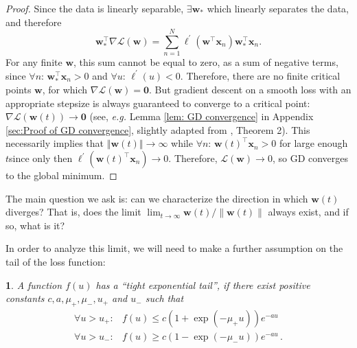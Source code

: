 \documentclass[twoside,11pt,english]{article}
\newtheorem{defn}[thm]{\protect\definitionname}
\providecommand{\definitionname}{Definition}
\providecommand{\definitionname}{Definition}
\begin{document}
\begin{proof}
Since the data is linearly separable, $\exists\mathbf{w}_{*}$
which linearly separates the data, and therefore 
\[
\mathbf{w}_{*}^{\top}\nabla\mathcal{L}\left(\mathbf{w}\right)=\sum_{n=1}^{N}\ell^{\prime}\left(\mathbf{w}^{\top}\mathbf{x}_{n}\right)\mathbf{w}_{*}^{\top}\mathbf{x}_{n}.
\]
For any finite $\mathbf{w}$, this sum cannot be equal to zero, as
a sum of negative terms, since $\forall n:\,\mathbf{w}_{*}^{\top}\mathbf{x}_{n}>0$
and $\forall u:\,\ell^{\prime}\left(u\right)<0$. Therefore, there
are no finite critical points $\mathbf{w}$, for which $\nabla\mathcal{L}\left(\mathbf{w}\right)=\mathbf{0}$.
But gradient descent on a smooth loss with an appropriate stepsize
is always guaranteed to converge to a critical point: $\nabla\mathcal{L}\left(\mathbf{w}\left(t\right)\right)\rightarrow\mathbf{0}$
(see, \emph{e.g.} Lemma \ref{lem: GD convergence} in Appendix \ref{sec:Proof of GD convergence},
slightly adapted from \citet{Ganti2015}, Theorem 2). This necessarily
implies that $\left\Vert \mathbf{w}\left(t\right)\right\Vert \rightarrow\infty$
while $\forall n:\,\mathbf{w}\left(t\right)^{\top}\mathbf{x}_{n}>0$
for large enough $t$\textemdash since only then $\ell^{\prime}\left(\mathbf{w}\left(t\right)^{\top}\mathbf{x}_{n}\right)\rightarrow0$.
Therefore, $\mathcal{L}\left(\mathbf{w}\right)\rightarrow0$, so GD
converges to the global minimum. 
\end{proof}
The main question we ask is: can we characterize the direction in
which $\mathbf{w}(t)$ diverges? That is, does the limit $\lim_{t\rightarrow\infty}\mathbf{w}\left(t\right)/\left\lVert \mathbf{w}\left(t\right)\right\rVert $
always exist, and if so, what is it?

In order to analyze this limit, we will need to make a further assumption
on the tail of the loss function: 
\begin{defn}
\label{def: exponential tail}A function $f\left(u\right)$ has a
``tight exponential tail'', if there exist positive constants $c,a,\mu_{+},\mu_{-},u_{+}$
and $u_{-}$ such that 
\begin{align*}
\forall u>u_{+}: & f\left(u\right)\leq c\left(1+\exp\left(-\mu_{+}u\right)\right)e^{-au}\\
\forall u>u_{-}: & f\left(u\right)\geq c\left(1-\exp\left(-\mu_{-}u\right)\right)e^{-au}\,.
\end{align*}
\end{defn}

{}
\end{document}
